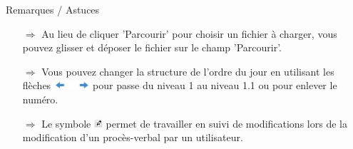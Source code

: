 \documentclass{article}
\begin{document}
\begin{beamerlikethm}{Remarques / Astuces}
\begin{itemize}
  \item[$\Longrightarrow$] Au lieu de cliquer 'Parcourir' pour choisir un fichier à charger, vous pouvez glisser et déposer le fichier sur le champ 'Parcourir'.
  \item[$\Longrightarrow$] Vous pouvez changer la structure de l'ordre du jour en utilisant les flèches \includegraphics[height=9pt]{Icons/Pfeil-links-rechts.jpg} pour passe du niveau 1 au niveau 1.1 ou pour enlever le numéro.
	\item[$\Longrightarrow$] Le symbole \includegraphics[height=9pt]{Icons/UeberarbModus.jpg} permet de travailler en suivi de modifications lors de la modification d'un procès-verbal par un utilisateur.
\end{itemize}
\end{beamerlikethm}

	
	


\pagebreak


\vspace{\baselineskip}


\end{document}
